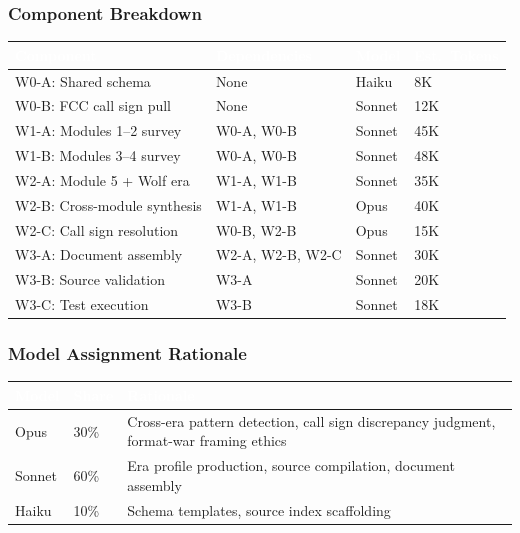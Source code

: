 \documentclass[11pt,letterpaper]{article}
\newcommand{\tableheader}[1]{\textbf{\sffamily\textcolor{white}{#1}}}
\begin{document}
\subsubsection{Component Breakdown}

\begin{center}
\begin{tabularx}{\textwidth}{L{3cm}L{2.5cm}C{1.5cm}C{1.5cm}}
\toprule
{}
\tableheader{Component} & \tableheader{Dependencies} & \tableheader{Model} & \tableheader{Est.\ Tokens} \\
\midrule
W0-A: Shared schema & None & Haiku & 8K \\
W0-B: FCC call sign pull & None & Sonnet & 12K \\
W1-A: Modules 1--2 survey & W0-A, W0-B & Sonnet & 45K \\
W1-B: Modules 3--4 survey & W0-A, W0-B & Sonnet & 48K \\
W2-A: Module 5 + Wolf era & W1-A, W1-B & Sonnet & 35K \\
W2-B: Cross-module synthesis & W1-A, W1-B & Opus & 40K \\
W2-C: Call sign resolution & W0-B, W2-B & Opus & 15K \\
W3-A: Document assembly & W2-A, W2-B, W2-C & Sonnet & 30K \\
W3-B: Source validation & W3-A & Sonnet & 20K \\
W3-C: Test execution & W3-B & Sonnet & 18K \\
\bottomrule
\end{tabularx}
\end{center}

\subsubsection{Model Assignment Rationale}

\begin{center}
\begin{tabularx}{\textwidth}{L{1.5cm}C{1.5cm}X}
\toprule
{}
\tableheader{Model} & \tableheader{Share} & \tableheader{Rationale} \\
\midrule
Opus & 30\% & Cross-era pattern detection, call sign discrepancy judgment, format-war framing ethics \\
Sonnet & 60\% & Era profile production, source compilation, document assembly \\
Haiku & 10\% & Schema templates, source index scaffolding \\
\bottomrule
\end{tabularx}
\end{center}
\end{document}

